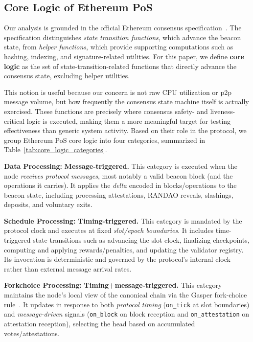 \subsection{Core Logic of Ethereum PoS}
\label{subsec:corelogic}

Our analysis is grounded in the official Ethereum consensus specification~\cite{ethereum_phase0_2020}. The specification distinguishes \emph{state transition functions}, which advance the beacon state, from \emph{helper functions}, which provide supporting computations such as hashing, indexing, and signature-related utilities. For this paper, we define \textbf{core logic} as the set of state-transition-related functions that directly advance the consensus state, excluding helper utilities.

This notion is useful because our concern is not raw CPU utilization or p2p message volume, but how frequently the consensus state machine itself is actually exercised. These functions are precisely where consensus safety- and liveness-critical logic is executed, making them a more meaningful target for testing effectiveness than generic system activity. Based on their role in the protocol, we group Ethereum PoS core logic into four categories, summarized in Table~\ref{tab:core_logic_categories}.

\smallskip
\noindent\textbf{ Data Processing:} \textbf{Message-triggered.} This category is executed when the node \emph{receives protocol messages}, most notably a valid beacon block (and the operations it carries). It applies the \textit{delta} encoded in blocks/operations to the beacon state, including processing attestations, RANDAO reveals, slashings, deposits, and voluntary exits.

\smallskip
\noindent\textbf{ Schedule Processing:} \textbf{Timing-triggered.} This category is mandated by the protocol clock and executes at fixed \emph{slot/epoch boundaries}. It includes time-triggered state transitions such as advancing the slot clock, finalizing checkpoints, computing and applying rewards/penalties, and updating the validator registry. Its invocation is deterministic and governed by the protocol's internal clock rather than external message arrival rates.

\smallskip
\noindent\textbf{ Forkchoice Processing:} \textbf{Timing+message-triggered.} This category maintains the node's local view of the canonical chain via the Gasper fork-choice rule~\cite{Gasper}. It updates in response to both \emph{protocol timing} (\texttt{on\_tick} at slot boundaries) and \emph{message-driven} signals (\texttt{on\_block} on block reception and \texttt{on\_attestation} on attestation reception), selecting the head based on accumulated votes/attestations.

